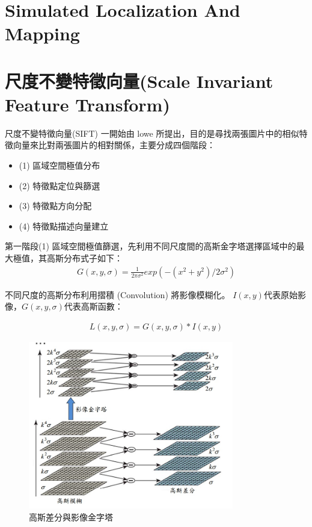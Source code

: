 \section{Simulated Localization And Mapping} %


\section{尺度不變特徵向量(Scale Invariant Feature Transform)}
	尺度不變特徵向量(SIFT) 一開始由 lowe \cite{Lowe2004} 所提出，目的是尋找兩張圖片中的相似特徵向量來比對兩張圖片的相對關係，主要分成四個階段：
\begin{itemize}
	\item (1) 區域空間極值分布
  \item (2) 特徵點定位與篩選
  \item (3) 特徵點方向分配
  \item (4) 特徵點描述向量建立
\end{itemize}

   第一階段(1) 區域空間極值篩選，先利用不同尺度間的高斯金字塔選擇區域中的最大極值，其高斯分布式子如下：
\begin{align}
  G(x,y,\sigma) = \frac{1}{2\pi\sigma^2}exp(-(x^2+y^2)/2\sigma^2) 
\end{align}

	不同尺度的高斯分布利用摺積 (Convolution) 將影像模糊化。 $I(x,y)$代表原始影像，$G(x,y,\sigma)$代表高斯函數：
	
\begin{align}
  L(x,y,\sigma) = G(x,y,\sigma)\ast{I(x,y)}
\end{align}

\begin{figure}
\begin{center}
  \includegraphics[width=0.8\textwidth]{figures/Gaussian_Prymaid.jpg}
  \caption{高斯差分與影像金字塔}
  \label{fig:Gaussian Prymaid}
\end{center}
\end{figure}  

